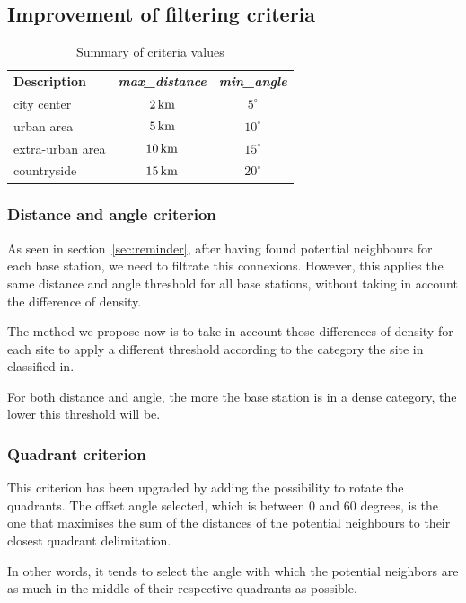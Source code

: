 \documentclass[lettersize,journal,english]{IEEEtran}
\begin{document}
\subsection{Improvement of filtering criteria}
\begin{table}
    \centering
    \caption{Summary of criteria values}
    \label{table:crit_summary}
    \begin{tabular}{lcc}
        \toprule
        \textbf{Description} & \textbf{\emph{max\_distance}} & \textbf{\emph{min\_angle}} \\
        \cmidrule(lr){1-3}
        city center & $\unit[2]{km}$ & $5^\circ$ \\
        urban area & $\unit[5]{km}$ & $10^\circ$ \\
        extra-urban area & $\unit[10]{km}$ & $15^\circ$ \\
        countryside & $\unit[15]{km}$ & $20^\circ$ \\
        \bottomrule
    \end{tabular}
\end{table}

\subsubsection{Distance and angle criterion}
As seen in section~\ref{sec:reminder}, after having found potential neighbours for each base station,
we need to filtrate this connexions. However, this applies the same distance and angle threshold for all base stations, without taking in account the difference of density.

The method we propose now is to take in account those differences of density for each site to apply a different threshold according to the category the site in classified in.

For both distance and angle, the more the base station is in a dense category, the lower this threshold will be.

\subsubsection{Quadrant criterion}
This criterion has been upgraded by adding the possibility to rotate the quadrants. The offset angle selected, which is between $0$ and 
$60$ degrees, is the one that maximises the sum of the distances of the potential neighbours to their closest quadrant delimitation.

In other words, it tends to select the angle with which the potential neighbors are as much in the middle of their respective quadrants
as possible.
\end{document}
